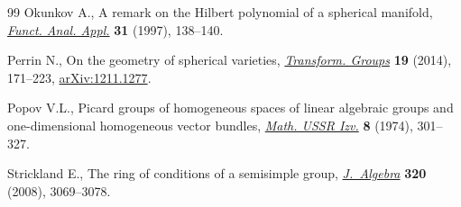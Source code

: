 \begin{thebibliography}{99}
Okunkov A., A remark on the {H}ilbert polynomial of a spherical manifold,
 \href{https://doi.org/10.1007/BF02466023}{\textit{Funct. Anal. Appl.}} \textbf{31} (1997), 138--140.

Perrin N., On the geometry of spherical varieties, \href{https://doi.org/10.1007/s00031-014-9254-0}{\textit{Transform. Groups}}
 \textbf{19} (2014), 171--223, \href{https://arxiv.org/abs/1211.1277}{arXiv:1211.1277}.

Popov V.L., Picard groups of homogeneous spaces of linear algebraic groups and
 one-dimensional homogeneous vector bundles, \href{https://doi.org/10.1070/IM1974v008n02ABEH002107}{\textit{Math. USSR Izv.}}
 \textbf{8} (1974), 301--327.

Strickland E., The ring of conditions of a semisimple group,
 \href{https://doi.org/10.1016/j.jalgebra.2008.07.003}{\textit{J.~Algebra}} \textbf{320} (2008), 3069--3078.

\end{thebibliography}
